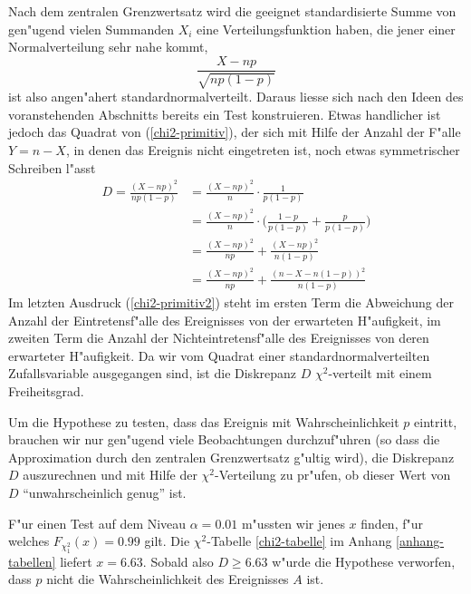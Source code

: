 Nach dem zentralen Grenzwertsatz wird die geeignet standardisierte Summe
von gen"ugend vielen Summanden $X_i$ eine Verteilungsfunktion haben,
die jener einer Normalverteilung sehr nahe kommt, 
\begin{equation}
\frac{X-np}{\sqrt{np(1-p)}}
\label{chi2-primitiv}
\end{equation}
ist also angen"ahert standardnormalverteilt.
Daraus liesse sich nach den
Ideen des voranstehenden Abschnitts bereits ein Test konstruieren.
Etwas handlicher ist jedoch das Quadrat von (\ref{chi2-primitiv}), der
sich mit Hilfe der Anzahl der F"alle $Y=n-X$, in denen das Ereignis
nicht eingetreten ist, noch etwas symmetrischer Schreiben l"asst
\begin{align}
D=\frac{(X-np)^2}{np(1-p)}
&=
\frac{(X-np)^2}{n}\cdot \frac{1}{p(1-p)}\nonumber
\\
&=
\frac{(X-np)^2}{n}\cdot
\biggl(
\frac{1-p}{p(1-p)} +
\frac{p}{p(1-p)}
\biggr)\nonumber
\\
&=
\frac{(X-np)^2}{np}+\frac{(X-np)^2}{n(1-p)}\nonumber
\\
&=
\frac{(X-np)^2}{np}+\frac{(n-X-n(1-p))^2}{n(1-p)}\label{chi2-primitiv2}
\end{align}
Im letzten Ausdruck (\ref{chi2-primitiv2})
steht im ersten Term die Abweichung der
Anzahl der Eintretensf"alle des Ereignisses von der erwarteten H"aufigkeit,
im zweiten Term die Anzahl der Nichteintretensf"alle des Ereignisses
von deren erwarteter H"aufigkeit.
Da wir vom Quadrat einer standardnormalverteilten Zufallsvariable ausgegangen
sind, ist die Diskrepanz $D$ $\chi^2$-verteilt mit einem Freiheitsgrad.

Um die Hypothese zu testen, dass das Ereignis mit Wahrscheinlichkeit $p$
eintritt, brauchen wir nur gen"ugend viele Beobachtungen durchzuf"uhren
(so dass die Approximation durch den zentralen Grenzwertsatz g"ultig wird),
die Diskrepanz $D$ auszurechnen und mit Hilfe der $\chi^2$-Verteilung
zu pr"ufen, ob dieser Wert von $D$ ``unwahrscheinlich genug'' ist.

F"ur einen Test auf dem Niveau $\alpha=0.01$ m"ussten wir jenes
$x$ finden, f"ur welches $F_{\chi^2_1}(x)=0.99$ gilt.
Die $\chi^2$-Tabelle \ref{chi2-tabelle} im Anhang \ref{anhang-tabellen}
liefert $x=6.63$.
Sobald also $D\ge 6.63$ w"urde die Hypothese verworfen,
dass $p$ nicht die Wahrscheinlichkeit des Ereignisses $A$ ist.

